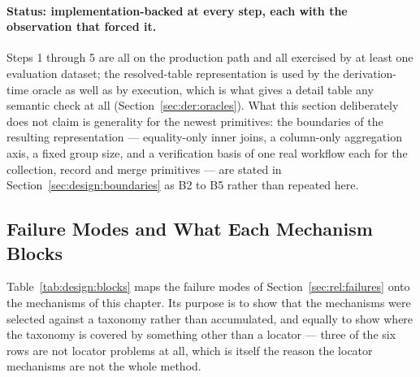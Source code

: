 \paragraph{Status: implementation-backed at every step, each with the observation that forced
it.}
Steps 1 through 5 are all on the production path and all exercised by at least one evaluation
dataset; the resolved-table representation is used by the derivation-time oracle as well as by
execution, which is what gives a detail table any semantic check at all
(Section~\ref{sec:der:oracles}). What this section deliberately does not claim is generality
for the newest primitives: the boundaries of the resulting representation --- equality-only
inner joins, a column-only aggregation axis, a fixed group size, and a verification basis of
one real workflow each for the collection, record and merge primitives --- are stated in
Section~\ref{sec:design:boundaries} as B2 to B5 rather than repeated here.

\subsection{Failure Modes and What Each Mechanism Blocks}
\label{sec:design:loc:coverage}

Table~\ref{tab:design:blocks} maps the failure modes of Section~\ref{sec:rel:failures} onto
the mechanisms of this chapter. Its purpose is to show that the mechanisms were selected
against a taxonomy rather than accumulated, and equally to show where the taxonomy is
covered by something other than a locator --- three of the six rows are not locator problems
at all, which is itself the reason the locator mechanisms are not the whole method.

